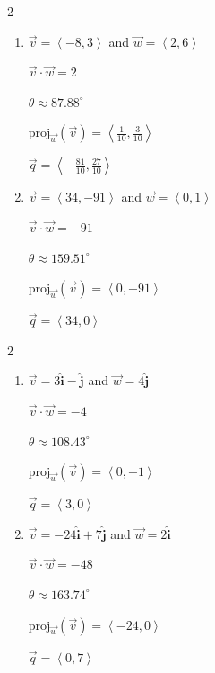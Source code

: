 \documentclass{ximera}
\begin{document}
 
\begin{multicols}{2} \raggedcolumns 
\begin{enumerate}
\setcounter{enumi}{\value{HW}}


\item $\overrightarrow{v} = \left\langle -8, 3 \right\rangle$ and $\overrightarrow{w} = \left\langle 2, 6 \right\rangle$

 $\overrightarrow{v} \cdot \overrightarrow{w} = 2$

 $\theta \approx 87.88^{\circ}$ 

 $\text{proj}_{\overrightarrow{w}}(\overrightarrow{v}) = \left\langle \frac{1}{10}, \frac{3}{10} \right\rangle$

 $\overrightarrow{q} = \left\langle -\frac{81}{10}, \frac{27}{10} \right\rangle$



\item $\overrightarrow{v} = \left\langle 34, -91 \right\rangle$ and $\overrightarrow{w} = \left\langle 0, 1 \right\rangle$

 $\overrightarrow{v} \cdot \overrightarrow{w} = -91$

 $\theta \approx  159.51^{\circ}$ 

 $\text{proj}_{\overrightarrow{w}}(\overrightarrow{v}) = \left\langle 0, -91 \right\rangle$

 $\overrightarrow{q} = \left\langle 34, 0 \right\rangle$
 
\setcounter{HW}{\value{enumi}}
\end{enumerate}
\end{multicols}



\begin{multicols}{2} \raggedcolumns 
\begin{enumerate}
\setcounter{enumi}{\value{HW}}


\item $\overrightarrow{v} =3 \bm\hat{\text{i}}-  \bm\hat{\text{j}}$ and $\overrightarrow{w} = 4 \bm\hat{\text{j}}$

 $\overrightarrow{v} \cdot \overrightarrow{w} = -4$

 $\theta \approx 108.43^{\circ}$ 

 $\text{proj}_{\overrightarrow{w}}(\overrightarrow{v}) = \left\langle 0,-1 \right\rangle$

 $\overrightarrow{q} = \left\langle 3,0 \right\rangle$



\item $\overrightarrow{v} = -24 \bm\hat{\text{i}}+ 7 \bm\hat{\text{j}}$ and $\overrightarrow{w} = 2 \bm\hat{\text{i}}$

 $\overrightarrow{v} \cdot \overrightarrow{w} = -48$

 $\theta \approx 163.74^{\circ}$ 

 $\text{proj}_{\overrightarrow{w}}(\overrightarrow{v}) = \left\langle -24,0 \right\rangle$

 $\overrightarrow{q} = \left\langle 0,7\right\rangle$
 
\setcounter{HW}{\value{enumi}}
\end{enumerate}
\end{multicols}
\end{document}

